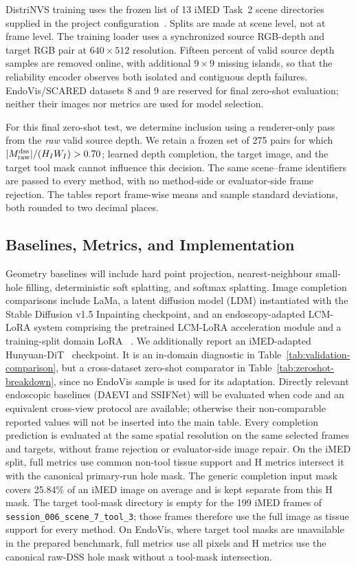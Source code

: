 \documentclass[letterpaper,10pt,conference]{ieeeconf}
\begin{document}
DistriNVS training uses the frozen list of 13 iMED Task~2 scene directories supplied in
the project configuration~\cite{imed2026}. Splits are made at scene level, not
at frame level. The training loader uses a synchronized source RGB-depth and
target RGB pair at $640\times512$ resolution. Fifteen percent of valid source
depth samples are removed online, with additional $9\times9$ missing islands,
so that the reliability encoder observes both isolated and contiguous depth
failures. EndoVis/SCARED datasets 8 and 9 are reserved for final zero-shot
evaluation; neither their images nor metrics are used for model selection.

For this final zero-shot test, we determine inclusion using a renderer-only
pass from the \emph{raw} valid source depth. We retain a frozen set of 275 pairs
for which $|M_{\rm raw}^{\rm dss}|/(H_IW_I)>0.70$; learned depth completion, the
target image, and the target tool mask cannot influence this decision. The same
scene--frame identifiers are passed to every method, with no method-side or
evaluator-side frame rejection. The tables report frame-wise means and sample
standard deviations, both rounded to two decimal places.

\subsection{Baselines, Metrics, and Implementation}
\label{sec:implementation}

Geometry baselines will include hard point projection, nearest-neighbour
small-hole filling, deterministic soft splatting, and softmax splatting. Image
completion comparisons include LaMa, a latent diffusion model (LDM)
instantiated with the Stable Diffusion v1.5 Inpainting checkpoint, and an
endoscopy-adapted LCM-LoRA system comprising the pretrained LCM-LoRA
acceleration module and a training-split domain LoRA
~\cite{suvorov2022lama,rombach2022ldm,luo2023lcmlora}. We additionally report
an iMED-adapted Hunyuan-DiT~\cite{li2024hunyuandit} checkpoint. It is an
in-domain diagnostic in Table~\ref{tab:validation-comparison}, but a
cross-dataset zero-shot comparator in Table~\ref{tab:zeroshot-breakdown}, since
no EndoVis sample is used for its adaptation. Directly relevant
endoscopic baselines (DAEVI and SSIFNet) will be evaluated when code and an
equivalent cross-view protocol are available; otherwise their non-comparable
reported values will not be inserted into the main table. Every completion
prediction is evaluated at the same spatial resolution on the same selected
frames and targets, without frame rejection or evaluator-side image repair.
On the iMED split, full metrics use common non-tool tissue support and H metrics
intersect it with the canonical primary-run hole mask. The generic completion
input mask covers 25.84\% of an iMED image on average and is kept separate from
this H mask. The target tool-mask directory is empty for the 199 iMED frames of
\texttt{session\_006\_scene\_7\_tool\_3}; those frames therefore use the full
image as tissue support for every method. On EndoVis, where target tool masks
are unavailable in the prepared benchmark, full metrics use all pixels and H
metrics use the canonical raw-DSS hole mask without a tool-mask intersection.
\end{document}
